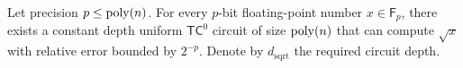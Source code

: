 \begin{lemma}\label{lem:sqrt}
    Let precision $p \leq \operatorname{poly}(n)$. For every $p$-bit floating-point number $x \in \mathsf{F}_p$, there exists a constant depth uniform $\mathsf{TC}^0$ circuit of size $\operatorname{poly}(n)$ that can compute $\sqrt{x}$ with relative error bounded by $2^{-p}$. Denote by $d_{\mathrm{sqrt}}$ the required circuit depth.    
\end{lemma}

